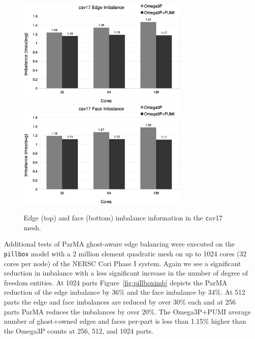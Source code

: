 \documentclass[review,12pt]{elsarticle_summary_report}
\begin{document}
\begin{figure}[!ph]
\centering
  \includegraphics[width=0.75\textwidth]{cav17-edge-imb.eps} \\
  \includegraphics[width=0.75\textwidth]{cav17-face-imb.eps} 
  \caption{\label{fig:cav17imb} Edge (top) and face (bottom) imbalance information in the {\texttt cav17} mesh.}
\end{figure}

Additional tests of ParMA ghost-aware edge balancing were executed on the
\texttt{pillbox} model with a 2 million element quadratic mesh on up to 1024
cores (32 cores per node) of the NERSC Cori Phase I system.
Again we see a significant reduction in imbalance with a less significant increase in the number of degree of freedom entities.
At 1024 parts Figure~\ref{fig:pillboximb} depicts the ParMA reduction of the
edge imbalance by 36\% and the face imbalance by 34\%.
At 512 parts the edge and face imbalances are reduced by over 30\% each and
at 256 parts ParMA reduces the imbalances by over 20\%.
The Omega3P+PUMI average number of ghost+owned edges and faces per-part
is less than 1.15\% higher than the Omega3P counts at 256, 512, and 1024 parts.
\end{document}
